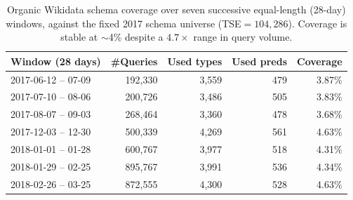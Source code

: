 \documentclass[sw]{iosart2x}
\begin{document}
\begin{table}[ht]
\centering
\caption{Organic Wikidata schema coverage over seven successive equal-length (28-day) windows, against the fixed 2017 schema universe (TSE${=}104{,}286$). Coverage is stable at $\sim$4\% despite a $4.7\times$ range in query volume.}
\label{tab:temporaltraj}
\begin{tabular}{l|r|r|r|r}
\hline
Window (28 days) & \#Queries & Used types & Used preds & Coverage \\
\hline
2017-06-12 -- 07-09 & 192,330 & 3,559 & 479 & 3.87\% \\
2017-07-10 -- 08-06 & 200,726 & 3,486 & 505 & 3.83\% \\
2017-08-07 -- 09-03 & 268,464 & 3,360 & 478 & 3.68\% \\
2017-12-03 -- 12-30 & 500,339 & 4,269 & 561 & 4.63\% \\
2018-01-01 -- 01-28 & 600,767 & 3,977 & 518 & 4.31\% \\
2018-01-29 -- 02-25 & 895,767 & 3,991 & 536 & 4.34\% \\
2018-02-26 -- 03-25 & 872,555 & 4,300 & 528 & 4.63\% \\
\hline
\end{tabular}
\end{table}
\end{document}
